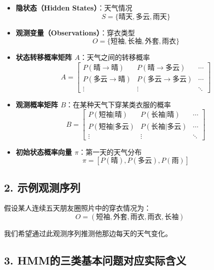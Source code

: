 \documentclass{article}
\begin{document}
\begin{itemize}
  \item \textbf{隐状态（Hidden States）}：天气情况 \\[3pt]
    \[
    S = \{\text{晴天}, \text{多云}, \text{雨天} \}
    \]
    
  \item \textbf{观测变量（Observations）}：穿衣类型 \\[3pt]
    \[
    O = \{\text{短袖}, \text{长袖}, \text{外套}, \text{雨衣} \}
    \]
    
  \item \textbf{状态转移概率矩阵 $A$}：天气之间的转移概率 \\[3pt]
    \[
    A = 
    \begin{bmatrix}
    P(\text{晴} \rightarrow \text{晴}) & P(\text{晴} \rightarrow \text{多云}) & \cdots \\
    P(\text{多云} \rightarrow \text{晴}) & P(\text{多云} \rightarrow \text{多云}) & \cdots \\
    \vdots & \vdots & \ddots
    \end{bmatrix}
    \]
    
  \item \textbf{观测概率矩阵 $B$}：在某种天气下穿某类衣服的概率 \\[3pt]
    \[
    B = 
    \begin{bmatrix}
    P(\text{短袖}|\text{晴}) & P(\text{长袖}|\text{晴}) & \cdots \\
    P(\text{短袖}|\text{多云}) & P(\text{长袖}|\text{多云}) & \cdots \\
    \vdots & \vdots & \ddots
    \end{bmatrix}
    \]
    
  \item \textbf{初始状态概率向量 $\pi$}：第一天的天气分布 \\[3pt]
    \[
    \pi = \left[ P(\text{晴}), P(\text{多云}), P(\text{雨}) \right]
    \]
\end{itemize}

\subsection*{2. 示例观测序列}

假设某人连续五天朋友圈照片中的穿衣情况为：
\[
O = (\text{短袖}, \text{外套}, \text{雨衣}, \text{雨衣}, \text{长袖})
\]

我们希望通过此观测序列推测他那边每天的天气变化。

\subsection*{3. HMM的三类基本问题对应实际含义}
\end{document}
